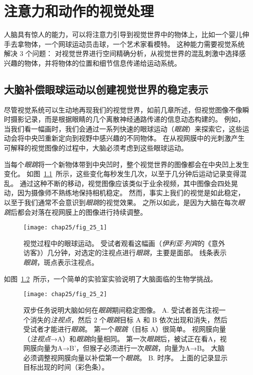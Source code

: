 \chapter{注意力和动作的视觉处理} \label{chap:chap25}

人脑具有惊人的能力，可以将注意力引导到视觉世界中的物体上，比如一个婴儿伸手去拿物体，一个网球运动员击球，一个艺术家看模特。
这种能力需要视觉系统解决 3 个问题：
对视觉世界进行空间精确分析，从视觉世界的混乱刺激中选择感兴趣的物体，并将物体的位置和细节信息传递给运动系统。



\section{大脑补偿眼球运动以创建视觉世界的稳定表示}

尽管视觉系统可以生动地再现我们的视觉世界，如前几章所述，但视觉图像不像瞬时摄影记录，而是根据眼睛的几个离散神经通路传递的信息动态构建的。
例如，当我们看一幅画时，我们会通过一系列快速的眼球运动（\textit{眼跳}）来探索它，这些运动会将中央凹重新定向到视野中感兴趣的不同物体。
在从视网膜中的光刺激产生可解释的视觉图像的过程中，大脑必须考虑到这些眼球运动。


当每个\textit{眼跳}将一个新物体带到中央凹时，整个视觉世界的图像都会在中央凹上发生变化。
如图~\ref{fig:25_1}~所示，这些变化每秒发生几次，以至于几分钟后运动记录变得混乱。
通过这种不断的移动，视觉图像应该类似于业余视频，其中图像会四处晃动，因为摄像师不熟练地保持相机稳定。
然而，事实上我们的视觉是如此稳定，以至于我们通常不会意识到\textit{眼跳}的视觉效果。
之所以如此，是因为大脑在每次\textit{眼跳}后都会对落在视网膜上的图像进行持续调整。


\begin{figure}[htbp]
	\centering
	\texttt{[image: chap25/fig\_25\_1]}
	\caption{视觉过程中的眼球运动。
		受试者观看这幅画（\textit{伊利亚$\cdot$列宾}的《意外访客》）几分钟，对选定的注视点进行\textit{眼跳}，主要是面部。
		线条表示\textit{眼跳}，斑点表示注视点。}
	\label{fig:25_1}
\end{figure}


如图~\ref{fig:25_2}~所示，一个简单的实验室实验说明了大脑面临的生物学挑战。


\begin{figure}[htbp]
	\centering
	\texttt{[image: chap25/fig\_25\_2]}
	\caption{双步任务说明大脑如何在\textit{眼跳}期间稳定图像。
		A. 受试者首先注视一个消失的\textit{注视点}，然后 2 个\textit{眼跳}目标 A 和 B 依次出现和消失，然后受试者才能进行\textit{眼跳}。
		第一个\textit{眼跳}（目标 A）很简单。
		视网膜向量（\textit{注视点}→A）和\textit{眼跳}向量相同。
		第一次\textit{眼跳}后，被试正在看A，视网膜向量为A→B'，但猴子必须进行一次\textit{眼跳}，向量为A→B。
		大脑必须调整视网膜向量以补偿第一个\textit{眼跳}。
		B. 时序。
		上面的记录显示目标出现的时间（彩色条）。}
	\label{fig:25_2}
\end{figure}




